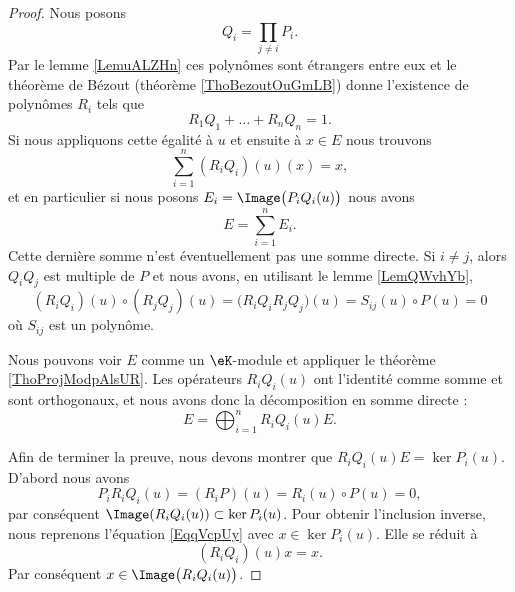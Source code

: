 \begin{proof}
    Nous posons 
    \begin{equation}
        Q_i=\prod_{j\neq i}P_i.
    \end{equation}
    Par le lemme \ref{LemuALZHn} ces polynômes sont étrangers entre eux et le théorème de Bézout (théorème \ref{ThoBezoutOuGmLB}) donne l'existence de polynômes \( R_i\) tels que
    \begin{equation}
        R_1Q_1+\ldots+R_nQ_n=1.
    \end{equation}
    Si nous appliquons cette égalité à \( u\) et ensuite à \( x\in E\) nous trouvons
    \begin{equation}        \label{EqqVcpUy}
        \sum_{i=1}^n(R_iQ_i)(u)(x)=x,
    \end{equation}
    et en particulier si nous posons \( E_i=\Image\big(P_iQ_i(u)\big)\) nous avons
    \begin{equation}
        E=\sum_{i=1}^nE_i.
    \end{equation}
    Cette dernière somme n'est éventuellement pas une somme directe. Si \( i\neq j\), alors \( Q_iQ_j\) est multiple de \( P\) et nous avons, en utilisant le lemme \ref{LemQWvhYb}, 
    \begin{equation}
        (R_iQ_i)(u)\circ (R_jQ_j)(u)=\big( R_iQ_iR_jQ_j \big)(u)=S_{ij}(u)\circ P(u)=0
    \end{equation}
    où \( S_{ij}\) est un polynôme. 

    Nous pouvons voir \( E\) comme un \( \eK\)-module et appliquer le théorème \ref{ThoProjModpAlsUR}. Les opérateurs \( R_iQ_i(u)\) ont l'identité comme somme et sont orthogonaux, et nous avons donc la décomposition en somme directe :
    \begin{equation}
        E=\bigoplus_{i=1}^nR_iQ_i(u)E.
    \end{equation}

    Afin de terminer la preuve, nous devons montrer que \( R_iQ_i(u)E=\ker P_i(u)\). D'abord nous avons
    \begin{equation}
        P_iR_iQ_i(u)=(R_iP)(u)=R_i(u)\circ P(u)=0,
    \end{equation}
    par conséquent \( \Image(R_iQ_i(u))\subset \ker P_i(u)\). Pour obtenir l'inclusion inverse, nous reprenons l'équation \eqref{EqqVcpUy} avec \( x\in\ker P_i(u)\). Elle se réduit à
    \begin{equation}
        (R_iQ_i)(u)x=x.
    \end{equation}
    Par conséquent \( x\in\Image\big( R_iQ_i(u) \big)\).
\end{proof}

